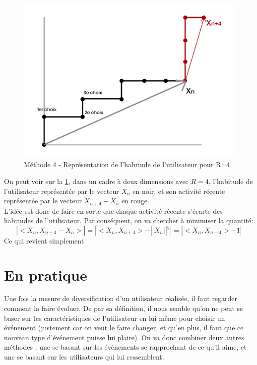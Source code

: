 \documentclass[11pt, oneside]{article}
\begin{document}
\begin{figure}[h]
  \includegraphics[width=\linewidth]{Visuels/vecteurmoyen.png}
  \caption{Méthode 4 - Représentation de l'habitude de l'utilisateur pour R=4}
  \label{fig:methodequatre}
\end{figure}

On peut voir sur la \ref{fig:methodequatre}, dans un cadre à deux dimensions avec $R=4$, l'habitude de l'utilisateur représentée par le vecteur $X_{n}$ en noir, et son activité récente représentée par le vecteur $X_{n+4}-X_{n}$ en rouge.\\
L'idée est donc de faire en sorte que chaque activité récente s'écarte des habitudes de l'utilisateur. Par conséquent, on va chercher à minimiser la quantité:
$$|<X_{n},X_{n+4}-X_{n}>|=|<X_{n},X_{n+4}>-||X_{n}||^{2}|=|<X_{n},X_{n+4}>-1|$$
Ce qui revient simplement

\section{En pratique}

Une fois la mesure de diversification d'un utilisateur réalisée, il faut regarder comment la faire évoluer. De par sa définition, il nous semble qu'on ne peut se baser sur les caractéristiques de l'utilisateur en lui même pour choisir un événement (justement car on veut le faire changer, et qu'en plus, il faut que ce nouveau type d'événement puisse lui plaire). On va donc combiner deux autres méthodes : une se basant sur les événements se rapprochant de ce qu'il aime, et une se basant sur les utilisateurs qui lui ressemblent. \\
\end{document}

